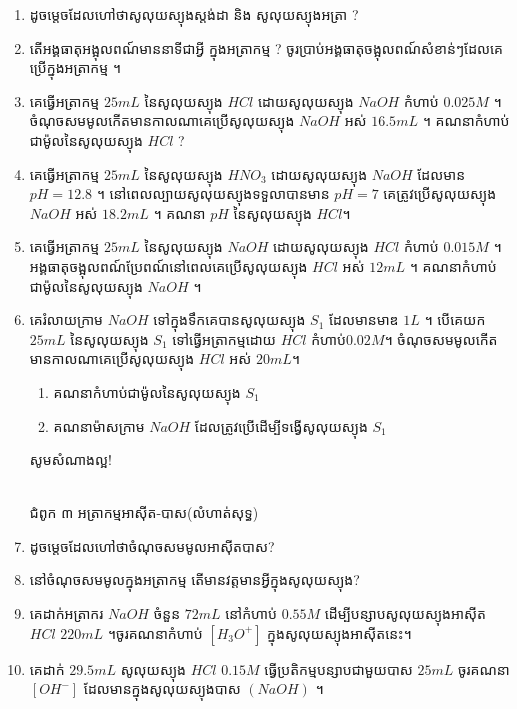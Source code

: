 \documentclass[12pt, a5paper]{article}
\begin{document}
\maketitle
\begin{enumerate}[m]
	\item ដូចម្តេចដែលហៅថាសូលុយស្យុងស្តង់ដា និង សូលុយស្យុងអត្រា ?
	\item តើអង្គធាតុអង្អុលពណ៍មាននាទីជាអ្វី ក្នុងអត្រាកម្ម ? ចូរប្រាប់អង្គធាតុចង្អុលពណ៍សំខាន់ៗដែលគេប្រើក្នុងអត្រាកម្ម ។
	\item គេធ្វើអត្រាកម្ម $25mL$ នៃសូលុយស្យុង $HCl$ ដោយសូលុយស្យុង $NaOH$ កំហាប់ $0.025M$ ។ ចំណុចសមមូលកើតមានកាលណាគេប្រើសូលុយស្យុង $NaOH$ អស់ $16.5mL$ ។ គណនាកំហាប់ជាម៉ូលនៃសូលុយស្យុង $HCl$ ?
	\item គេធ្វើអត្រាកម្ម $25mL$ នៃសូលុយស្យុង $HNO_3$ ដោយសូលុយស្យុង $NaOH$ ដែលមាន $pH=12.8$ ។ នៅពេលល្បាយសូលុយស្យុងទទួលាបានមាន $pH=7$ គេត្រូវប្រើសូលុយស្យុង $NaOH$ អស់ $18.2mL$ ។ គណនា $pH$ នៃសូលុយស្យុង $HCl$។
	\item គេធ្វើអត្រាកម្ម $25mL$ នៃសូលុយស្យុង $NaOH$ ដោយសូលុយស្យុង $HCl$ កំហាប់ $0.015M$ ។ អង្គធាតុចង្អុលពណ៍ប្រែពណ៍នៅពេលគេប្រើសូលុយស្យុង $HCl$ អស់ $12mL$ ។ គណនាកំហាប់ជាម៉ូលនៃសូលុយស្យុង $NaOH$ ។ 
	\item គេរំលាយក្រាម $NaOH$ ទៅក្នុងទឹកគេបានសូលុយស្យុង $S_1$ ដែលមានមាឌ $1L$ ។ បើគេយក $25mL$ នៃសូលុយស្យុង $S_1$ ទៅធ្វើអត្រាកម្មដោយ $HCl$ កំហាប់$0.02M$។ ចំណុចសមមូលកើតមានកាលណាគេប្រើសូលុយស្យុង $HCl$ អស់ $20mL$។
	\begin{enumerate}[k]
		\item គណនាកំហាប់ជាម៉ូលនៃសូលុយស្យុង $S_1$ 
		\item គណនាម៉ាសក្រាម $NaOH$ ដែលត្រូវប្រើដើម្បីទង្វើសូលុយស្យុង $S_1$
	\end{enumerate}
	\begin{center}
		\sffamily\color{black}
		សូមសំណាងល្អ!
	\end{center}\newpage
	\begin{center}
		\sffamily\color{black}
		\\
		ជំពូក ៣ អត្រាកម្មអាស៊ីត-បាស(លំហាត់សុទ្ធ)
	\end{center}
	\item ដូចម្តេចដែលហៅថាចំណុចសមមូលអាស៊ីតបាស?
	\item នៅចំណុចសមមូលក្នុងអត្រាកម្ម តើមានវត្តមានអ្វីក្នុងសូលុយស្យុង?
	\item គេដាក់អត្រាករ $NaOH$ ចំនួន $72mL$ នៅកំហាប់ $0.55M$ ដើម្បីបន្សាបសូលុយស្យុងអាស៊ីត $HCl$ $220mL$ ។ចូរគណនាកំហាប់ $[H_3O^+]$ ក្នុងសូលុយស្យុងអាស៊ីតនេះ។
	\item គេដាក់ $29.5mL$ សូលុយស្យុង $HCl$ $0.15M$ ធ្វើប្រតិកម្មបន្សាបជាមួយបាស $25mL$ ចូរគណនា $[OH^-]$ ដែលមានក្នុងសូលុយស្យុងបាស $(NaOH)$ ។

\end{enumerate}
\end{document}
